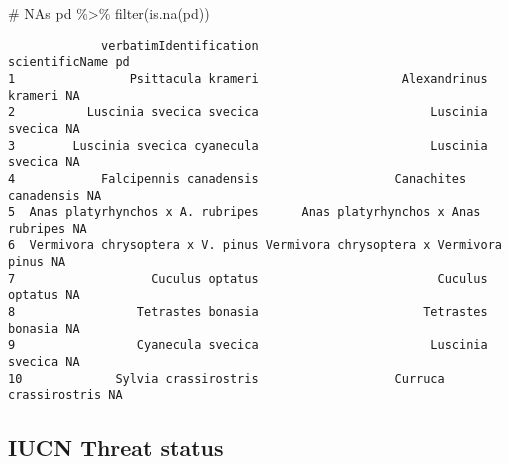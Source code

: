 \documentclass[
  letterpaper,
  DIV=11,
  numbers=noendperiod]{scrreprt}
\newenvironment{Shaded}{\begin{snugshade}}{\end{snugshade}}
\newcommand{\CommentTok}[1]{\textcolor[rgb]{0.37,0.37,0.37}{#1}}
\newcommand{\FunctionTok}[1]{\textcolor[rgb]{0.28,0.35,0.67}{#1}}
\newcommand{\NormalTok}[1]{\textcolor[rgb]{0.00,0.23,0.31}{#1}}
\newcommand{\SpecialCharTok}[1]{\textcolor[rgb]{0.37,0.37,0.37}{#1}}
\begin{document}
\begin{Shaded}
\begin{Highlighting}[]
\CommentTok{\# NAs}
\NormalTok{pd }\SpecialCharTok{\%\textgreater{}\%} \FunctionTok{filter}\NormalTok{(}\FunctionTok{is.na}\NormalTok{(pd))}
\end{Highlighting}
\end{Shaded}

\begin{verbatim}
             verbatimIdentification                          scientificName pd
1                Psittacula krameri                    Alexandrinus krameri NA
2          Luscinia svecica svecica                        Luscinia svecica NA
3        Luscinia svecica cyanecula                        Luscinia svecica NA
4            Falcipennis canadensis                   Canachites canadensis NA
5  Anas platyrhynchos x A. rubripes      Anas platyrhynchos x Anas rubripes NA
6  Vermivora chrysoptera x V. pinus Vermivora chrysoptera x Vermivora pinus NA
7                   Cuculus optatus                         Cuculus optatus NA
8                 Tetrastes bonasia                       Tetrastes bonasia NA
9                 Cyanecula svecica                        Luscinia svecica NA
10             Sylvia crassirostris                   Curruca crassirostris NA
\end{verbatim}

\hypertarget{iucn-threat-status}{%
\subsection{IUCN Threat status}\label{iucn-threat-status}}
\end{document}
